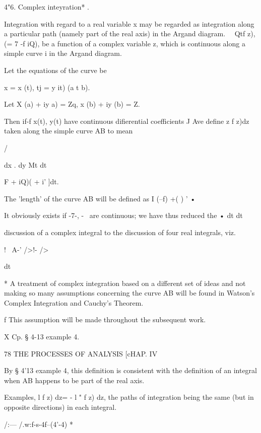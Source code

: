 4"6. Complex inteyration* .

Integration with regard to a real variable x may be regarded as
integration along a particular path (namely part of the real axis) in
the Argand diagram. \ \ Qtf z), (= 7 -f iQ), be a function of a
complex variable z, which is continuous along a simple curve i in the
Argand diagram.

Let the equations of the curve be

x = x (t), tj = y it) (a t b).

Let X (a) + iy a) = Zq, x (b) + iy (b) = Z.

Then if-f x(t), y(t) have continuous difierential coefficients J Ave
define z f z)dz taken along the simple curve AB to mean



/



dx . dy Mt dt



 F + iQ)( + i' ]dt.



The 'length' of the curve AB will be defined as I \/ (--f) +( ) ' •

It obviously exists if -7-, -~ are continuous; we have thus reduced
the • dt dt

discussion of a complex integral to the discussion of four real
integrals, viz.



! \ A-' />!- />



dt



* A treatment of complex integration based on a different set of ideas
and not making so many assumptions concerning the curve AB will be
found in Watson's Complex Integration and Cauchy's Theorem.

f This assumption will be made throughout the subsequent work.

X Cp. § 4-13 example 4.



78 THE PROCESSES OF ANALYSIS [cHAP. IV

By § 4'13 example 4, this definition is consistent with the definition
of an integral when AB happens to be part of the real axis.

Examples, l f z) dz= - l " f z) dz, the paths of integration being the
same (but in opposite directions) in each integral.

/:— /.w:f-s-4f--(4'-4) *\

